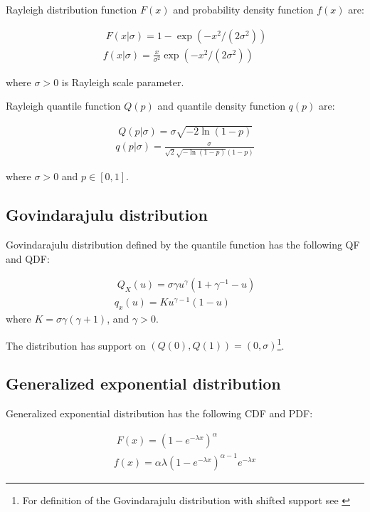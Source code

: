 \documentclass[
  12pt,
]{article}
\begin{document}
Rayleigh distribution function \(F(x)\) and probability density function \(f(x)\) are:

\[ 
\begin{gathered}\;
F(x|\sigma) = 1-\exp(-x^2/(2\sigma^2)) \\ 
f(x|\sigma) = \frac{x}{\sigma^2}\exp(-x^2/(2\sigma^2))
\end{gathered}
\]

where \(\sigma>0\) is Rayleigh scale parameter.

Rayleigh quantile function \(Q(p)\) and quantile density function \(q(p)\) are:

\[
\begin{gathered}\;
Q(p|\sigma)=\sigma\sqrt{-2\ln(1-p)} \\ 
q(p|\sigma)=\frac{\sigma}{\sqrt{2}\sqrt{-\ln(1-p)}(1-p)}
\end{gathered}
\]

where \(\sigma>0\) and \(p \in [0,1]\).

\hypertarget{govindarajulu-distribution}{%
\subsection{Govindarajulu distribution}\label{govindarajulu-distribution}}

Govindarajulu distribution defined by the quantile function has the following QF and QDF:

\[
\begin{gathered}\;
Q_X(u)=\sigma\gamma u^\gamma(1+\gamma^{-1}-u)\\
q_x(u)=Ku^{\gamma-1}(1-u)
\end{gathered}
\]
where \(K=\sigma\gamma(\gamma+1)\), and \(\gamma>0\).

The distribution has support on \((Q(0), Q(1))=(0, \sigma)\)\footnote{For definition of the Govindarajulu distribution with shifted support see \citet{nair2012GovindarajuluDistributionProperties}}.

\hypertarget{generalized-exponential-distribution}{%
\subsection{Generalized exponential distribution}\label{generalized-exponential-distribution}}

Generalized exponential distribution has the following CDF and PDF:

\[
\begin{gathered}\;
F(x)=(1-e^{-\lambda x})^\alpha \\
f(x)=\alpha\lambda(1-e^{-\lambda x})^{\alpha-1}e^{-\lambda x}
\end{gathered}
\]
\end{document}
